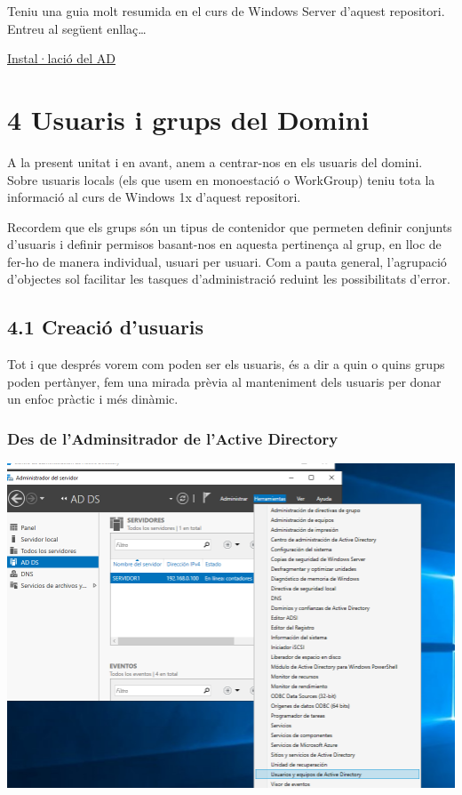 \documentclass[
  a4paper,
]{article}
\begin{document}
Teniu una guia molt resumida en el curs de Windows Server d'aquest
repositori. Entreu al següent enllaç\ldots{}

\href{https://github.com/tofermos/Windows-Server/blob/main/md/ADDSenWindowsServerGUI.md}{Instal·lació
del AD}

\section{4 Usuaris i grups del Domini}\label{usuaris-i-grups-del-domini}

A la present unitat i en avant, anem a centrar-nos en els usuaris del
domini. Sobre usuaris locals (els que usem en monoestació o WorkGroup)
teniu tota la informació al curs de Windows 1x d'aquest repositori.

Recordem que els grups són un tipus de contenidor que permeten definir
conjunts d'usuaris i definir permisos basant-nos en aquesta pertinença
al grup, en lloc de fer-ho de manera individual, usuari per usuari. Com
a pauta general, l'agrupació d'objectes sol facilitar les tasques
d'administració reduint les possibilitats d'error.

\subsection{4.1 Creació d'usuaris}\label{creaciuxf3-dusuaris}

Tot i que després vorem com poden ser els usuaris, és a dir a quin o
quins grups poden pertànyer, fem una mirada prèvia al manteniment dels
usuaris per donar un enfoc pràctic i més dinàmic.

\subsubsection{Des de l'Adminsitrador de l'Active
Directory}\label{des-de-ladminsitrador-de-lactive-directory}

\includegraphics{png/usuaris1.png}
\end{document}
